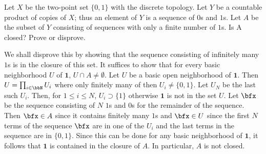 \begin{problem}
  Let \(X\) be the two-point set \(\{0,1\}\) with the discrete
  topology. Let \(Y\) be a countable product of copies of \(X\); thus an
  element of \(Y\) is a sequence of \(0\)s and \(1\)s.  Let \(A\) be the
  subset of \(Y\) consisting of sequences with only a finite number of
  \(1\)s. Is A closed?  Prove or disprove.
\end{problem}
\begin{solution}
  We shall disprove this by showing that the sequence consisting of
  infinitely many \(1\)s is in the closure of this set. It suffices to show
  that for every basic neighborhood \(U\) of \(\mathbf{1}\),
  \(U\cap A\neq\emptyset\). Let \(U\) be a basic open neighborhood of
  \(\mathbf{1}\). Then \(U=\prod_{i\in\bbN} U_i\) where only finitely many
  of then \(U_i\neq \{0,1\}\). Let \(U_N\) be the last such \(U_i\). Then,
  for \(1\leq i\leq N\), \(U_i\supset\{1\}\) otherwise \(\mathbf{1}\) is
  not in the set \(U\). Let \(\bfx\) be the sequence consisting of \(N\)
  \(1\)s and \(0\)s for the remainder of the sequence. Then \(\bfx\in A\)
  since it contains finitely many \(1\)s and \(\bfx\in U\) since the first
  \(N\) terms of the sequence \(\bfx\) are in one of the \(U_i\) and the
  last terms in the sequence are in \(\{0,1\}\). Since this can be done for
  any basic neighborhood of \(\mathbf{1}\), it follows that \(\mathbf{1}\)
  is contained in the closure of \(A\). In particular, \(A\) is not
  closed.
\end{solution}

